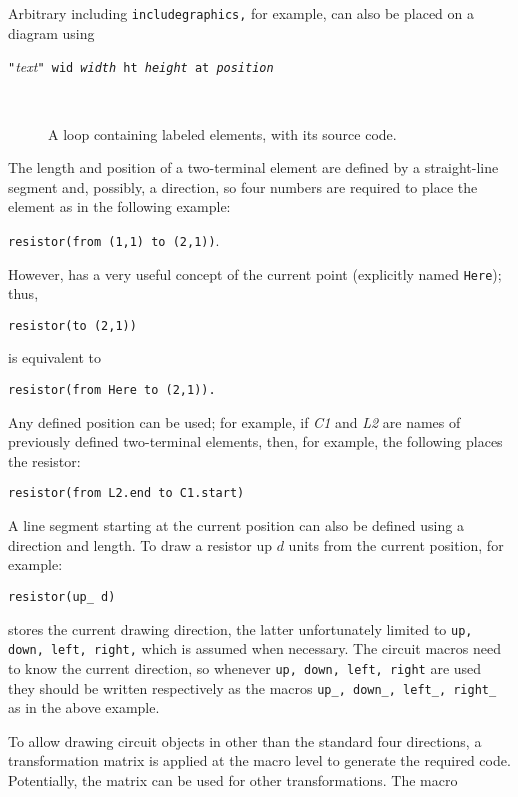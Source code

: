    Arbitrary \latex including {\bsl\tt includegraphics,} for example,
   can also be placed on a diagram using

   {\tt "}{\sl \latex text}{\tt" wid {\sl width} ht {\sl height}
      at {\sl position}}

\begin{figure}[ht]
   \vspace*{-\baselineskip}
   \parbox{4in}{\small }%
   \hfill\raise-0.5in\hbox{ }
   \vspace*{-\baselineskip}
   \caption{A loop containing labeled elements, with its source code.}
   \label{Loop}
   \end{figure}

The length and position of a two-terminal element
are defined by a straight-line segment and, possibly, a direction, so
four numbers are required to place the element as in the following example:
\par
{\tt resistor(from (1,1) to (2,1))}.

\noindent
However, \pic has a very useful concept of the current point (explicitly
named {\tt Here}); thus,
\par
{\tt resistor(to (2,1))}
\par
\noindent
is equivalent to
\par
{\tt resistor(from Here to (2,1)).}

Any defined position can be used; for example, if {\sl C1} and {\sl L2}
are names of previously defined two-terminal elements,
then, for example, the following places the resistor: 
\par
{\tt resistor(from L2.end to C1.start)}

A line segment starting at the current position can also be defined using
a direction and length.
To draw a resistor up $d$ units from the current position, for example:
\par
{\tt resistor(up\_ d)}

\Pic stores the current drawing direction,
the latter unfortunately limited to {\tt up, down, left, right,}
which is assumed when necessary.
The circuit macros need to know the current direction, so
whenever {\tt up, down, left, right} are used they should be written
respectively as the macros {\tt up\_, down\_, left\_, right\_} as in
the above example.

To allow drawing circuit objects in other than the standard four directions,
a transformation matrix
is applied at the macro level to generate the required \pic code.
Potentially, the matrix can be used for other transformations.
The macro

